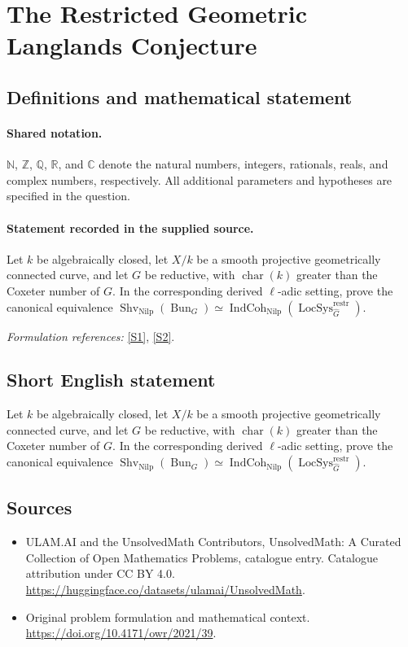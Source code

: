 \documentclass[11pt]{article}
\newcommand{\sref}[2]{\hyperlink{source:#1:#2}{[S#2]}}
\begin{document}
\section{The Restricted Geometric Langlands Conjecture}\label{statement}

\subsection{Definitions and mathematical statement}

\paragraph{Shared notation.}$\mathbb N$, $\mathbb Z$, $\mathbb Q$, $\mathbb R$, and $\mathbb C$ denote the natural numbers, integers, rationals, reals, and complex numbers, respectively. All additional parameters and hypotheses are specified in the question.


\paragraph{Statement recorded in the supplied source.}
Let $k$ be algebraically closed, let $X/k$ be a smooth projective geometrically connected curve, and let $G$ be reductive, with $\operatorname{char}(k)$ greater than the Coxeter number of $G$. In the corresponding derived $\ell$-adic setting, prove the canonical equivalence $\operatorname{Shv}_{\operatorname{Nilp}}(\operatorname{Bun}_G)\simeq\operatorname{IndCoh}_{\operatorname{Nilp}}(\operatorname{LocSys}^{\operatorname{restr}}_{\widehat G})$.
\par\smallskip\textit{Formulation references:} \sref{statement}{1}, \sref{statement}{2}.
\subsection{Short English statement}
Let $k$ be algebraically closed, let $X/k$ be a smooth projective geometrically connected curve, and let $G$ be reductive, with $\operatorname{char}(k)$ greater than the Coxeter number of $G$. In the corresponding derived $\ell$-adic setting, prove the canonical equivalence $\operatorname{Shv}_{\operatorname{Nilp}}(\operatorname{Bun}_G)\simeq\operatorname{IndCoh}_{\operatorname{Nilp}}(\operatorname{LocSys}^{\operatorname{restr}}_{\widehat G})$.
\subsection{Sources}
\begin{itemize}
\item[\hypertarget{source:statement:1}{S1}] ULAM.AI and the UnsolvedMath Contributors, UnsolvedMath: A Curated Collection of Open Mathematics Problems, catalogue entry. Catalogue attribution under CC BY 4.0.
\url{https://huggingface.co/datasets/ulamai/UnsolvedMath}.
\item[\hypertarget{source:statement:2}{S2}] Original problem formulation and mathematical context.
\url{https://doi.org/10.4171/owr/2021/39}.
\end{itemize}
\label{end:statement}
\end{document}

